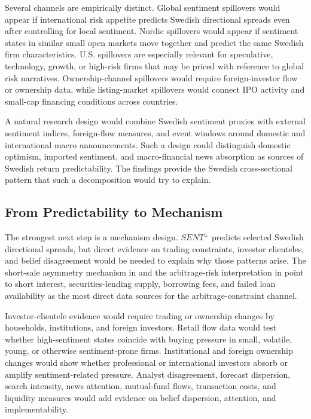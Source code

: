 \documentclass[11pt]{article}
\newcommand{\var}[1]{\ensuremath{#1}}
\begin{document}
Several channels are empirically distinct. Global sentiment spillovers would appear if international risk appetite predicts Swedish directional spreads even after controlling for local sentiment. Nordic spillovers would appear if sentiment states in similar small open markets move together and predict the same Swedish firm characteristics. U.S. spillovers are especially relevant for speculative, technology, growth, or high-risk firms that may be priced with reference to global risk narratives. Ownership-channel spillovers would require foreign-investor flow or ownership data, while listing-market spillovers would connect IPO activity and small-cap financing conditions across countries.

A natural research design would combine Swedish sentiment proxies with external sentiment indices, foreign-flow measures, and event windows around domestic and international macro announcements. Such a design could distinguish domestic optimism, imported sentiment, and macro-financial news absorption as sources of Swedish return predictability. The findings provide the Swedish cross-sectional pattern that such a decomposition would try to explain.

\subsection{From Predictability to Mechanism}
The strongest next step is a mechanism design. \var{SENT^{\perp}} predicts selected Swedish directional spreads, but direct evidence on trading constraints, investor clienteles, and belief disagreement would be needed to explain why those patterns arise. The short-sale asymmetry mechanism in \citet{stambaugh2012short} and the arbitrage-risk interpretation in \citet{stambaugh2015ivol} point to short interest, securities-lending supply, borrowing fees, and failed loan availability as the most direct data sources for the arbitrage-constraint channel.

Investor-clientele evidence would require trading or ownership changes by households, institutions, and foreign investors. Retail flow data would test whether high-sentiment states coincide with buying pressure in small, volatile, young, or otherwise sentiment-prone firms. Institutional and foreign ownership changes would show whether professional or international investors absorb or amplify sentiment-related pressure. Analyst disagreement, forecast dispersion, search intensity, news attention, mutual-fund flows, transaction costs, and liquidity measures would add evidence on belief dispersion, attention, and implementability.
\end{document}
